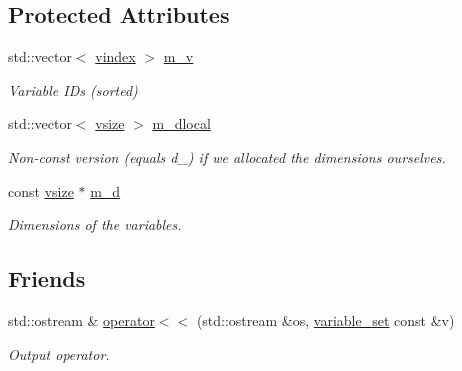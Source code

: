 \subsection*{Protected Attributes}
\begin{DoxyCompactItemize}
\item 
std\+::vector$<$ \hyperlink{classmerlin_1_1variable__set_a2dadc030390168fc0656308250716634}{vindex} $>$ \hyperlink{classmerlin_1_1variable__set_a3d38c96e0a61de6acab828960f708fec}{m\+\_\+v}\hypertarget{classmerlin_1_1variable__set_a3d38c96e0a61de6acab828960f708fec}{}\label{classmerlin_1_1variable__set_a3d38c96e0a61de6acab828960f708fec}

\begin{DoxyCompactList}\small\item\em Variable I\+Ds (sorted) \end{DoxyCompactList}\item 
std\+::vector$<$ \hyperlink{classmerlin_1_1variable__set_a05d7a8291564fa7fb236a5e9cb65c734}{vsize} $>$ \hyperlink{classmerlin_1_1variable__set_a163e6b42021ae47f0b03f92bf4f61655}{m\+\_\+dlocal}\hypertarget{classmerlin_1_1variable__set_a163e6b42021ae47f0b03f92bf4f61655}{}\label{classmerlin_1_1variable__set_a163e6b42021ae47f0b03f92bf4f61655}

\begin{DoxyCompactList}\small\item\em Non-\/const version (equals d\+\_\+) if we allocated the dimensions ourselves. \end{DoxyCompactList}\item 
const \hyperlink{classmerlin_1_1variable__set_a05d7a8291564fa7fb236a5e9cb65c734}{vsize} $\ast$ \hyperlink{classmerlin_1_1variable__set_a0d116bce2d0a762e2d22d3b24c50932e}{m\+\_\+d}\hypertarget{classmerlin_1_1variable__set_a0d116bce2d0a762e2d22d3b24c50932e}{}\label{classmerlin_1_1variable__set_a0d116bce2d0a762e2d22d3b24c50932e}

\begin{DoxyCompactList}\small\item\em Dimensions of the variables. \end{DoxyCompactList}\end{DoxyCompactItemize}
\subsection*{Friends}
\begin{DoxyCompactItemize}
\item 
std\+::ostream \& \hyperlink{classmerlin_1_1variable__set_a6be20cff1abbdcfb247a6278f6a16965}{operator$<$$<$} (std\+::ostream \&os, \hyperlink{classmerlin_1_1variable__set}{variable\+\_\+set} const \&v)\hypertarget{classmerlin_1_1variable__set_a6be20cff1abbdcfb247a6278f6a16965}{}\label{classmerlin_1_1variable__set_a6be20cff1abbdcfb247a6278f6a16965}

\begin{DoxyCompactList}\small\item\em Output operator. \end{DoxyCompactList}\end{DoxyCompactItemize}


